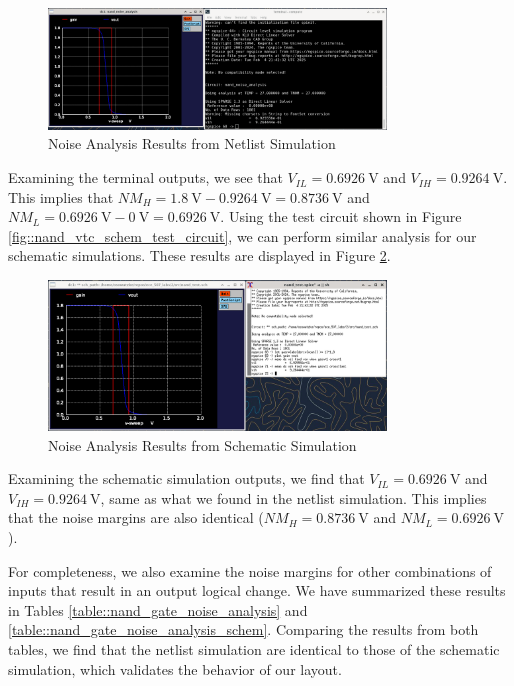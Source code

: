 \documentclass{article}
\begin{document}
	\begin{figure}[H]
		\centerline{\includegraphics[width=0.8\textwidth]{nand_noise_analysis.png}}
		\caption{Noise Analysis Results from Netlist Simulation}
		\label{fig::nand_noise_analysis}
	\end{figure}
	
	\noindent Examining the terminal outputs, we see that $V_{IL} = 0.6926\ \text{V}$ and $V_{IH} = 0.9264\ \text{V}$. This implies that $NM_H = 1.8\ \text{V} - 0.9264\ \text{V} = 0.8736\ \text{V}$ and $NM_L = 0.6926\ \text{V} - 0\ \text{V} = 0.6926\ \text{V}$. Using the test circuit shown in Figure \ref{fig::nand_vtc_schem_test_circuit}, we can perform similar analysis for our schematic simulations. These results are displayed in Figure \ref{fig::nand_noise_analysis_schem}.
	
	\begin{figure}[H]
		\centerline{\includegraphics[width=0.8\textwidth]{nand_noise_analysis_schem.png}}
		\caption{Noise Analysis Results from Schematic Simulation}
		\label{fig::nand_noise_analysis_schem}
	\end{figure}
	
	\noindent Examining the schematic simulation outputs, we find that $V_{IL} = 0.6926\ \text{V}$ and $V_{IH} = 0.9264\ \text{V}$, same as what we found in the netlist simulation. This implies that the noise margins are also identical ($NM_H = 0.8736\ \text{V}$ and $NM_L = 0.6926\ \text{V}$).	
	
	For completeness, we also examine the noise margins for other combinations of inputs that result in an output logical change. We have summarized these results in Tables \ref{table::nand_gate_noise_analysis} and \ref{table::nand_gate_noise_analysis_schem}. Comparing the results from both tables, we find that the netlist simulation are identical to those of the schematic simulation, which validates the behavior of our layout.
	
\end{document}
